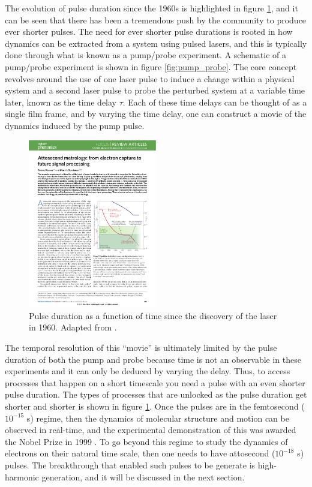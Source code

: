 The evolution of pulse duration since the 1960s is highlighted in figure \ref{fig:Pulse_duration}, and it can be seen that there has been a tremendous push by the community to produce ever shorter pulses.  The need for ever shorter pulse durations is rooted in how dynamics can be extracted from a system using pulsed lasers, and this is typically done through what is known as a pump/probe experiment. A schematic of a pump/probe experiment is shown in figure \ref{fig:pump_probe}.  The core concept revolves around the use of one laser pulse to induce a change within a physical system and a second laser pulse to probe the perturbed system at a variable time later, known as the time delay $\tau$.  Each of these time delays can be thought of as a single film frame, and by varying the time delay, one can construct a movie of the dynamics induced by the pump pulse.  

\begin{figure}
	\centering
	\includegraphics[width=0.5\textwidth]{figures/Introduction/Pulse_duration.pdf}
	\caption[Pulse duration as a function of time since the 1960s]{Pulse duration as a function of time since the discovery of the laser in 1960.  Adapted from \cite{krauszAttosecondMetrologyElectron2014}.}
	\label{fig:Pulse_duration}
\end{figure}

The temporal resolution of this ``movie'' is ultimately limited by the pulse duration of both the pump and probe because time is not an observable in these experiments and it can only be deduced by varying the delay.  Thus, to access processes that happen on a short timescale you need a pulse with an even shorter pulse duration.  The types of processes that are unlocked as the pulse duration get shorter and shorter is shown in figure \ref{fig:Pulse_duration}.  Once the pulses are in the femtosecond ($10^{-15}$ s) regime, then the dynamics of molecular structure and motion can be observed in real-time, and the experimental demonstration of this was awarded the Nobel Prize in 1999 \cite{zewailLaserFemtochemistry1988}.  To go beyond this regime to study the dynamics of electrons on their natural time scale, then one needs to have attosecond ($10^{-18}$ s) pulses.  The breakthrough that enabled such pulses to be generate is high-harmonic generation, and it will be discussed in the next section.

